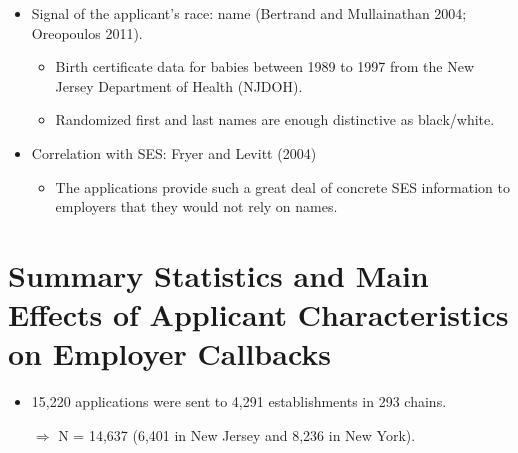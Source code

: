\documentclass[../root]{subfiles}
\begin{document}
    \begin{itemize}
      \item Signal of the applicant's race: name (Bertrand and Mullainathan 2004; Oreopoulos 2011).
      \begin{itemize}
        \item Birth certificate data for babies between 1989 to 1997 from the New Jersey Department of Health (NJDOH).
        \item Randomized first and last names are enough distinctive as black/white.
      \end{itemize}
      \item Correlation with SES: Fryer and Levitt (2004)
      \begin{itemize}
        \item The applications provide such a great deal of concrete SES information to employers that they would not rely on names.
      \end{itemize}
    \end{itemize}


    \section{Summary Statistics and Main Effects of Applicant Characteristics on Employer Callbacks}

    \begin{itemize}
      \item 15,220 applications were sent to 4,291 establishments in 293 chains.

      $\Rightarrow$ N = 14,637 (6,401 in New Jersey and 8,236 in New York).
    \end{itemize}
\end{document}
